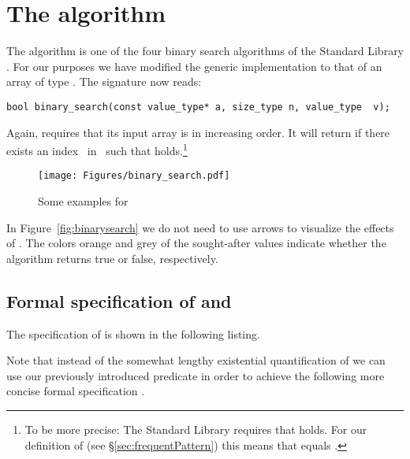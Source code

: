 \section{The \binarysearch algorithm}


The \binarysearch algorithm is one of the four binary search
algorithms of the \cxx Standard Library \cite[\S 28.7.3.4]{cxx-17-draft}.
For our purposes we have modified
the generic implementation
to that of an array of type .
The signature now reads:

\begin{lstlisting}[style = acsl-block]
  bool binary_search(const value_type* a, size_type n, value_type  v);
\end{lstlisting}

Again, \binarysearch requires that its input array is in increasing order.
It will return  if there exists an index~ 
in~ such that  holds.\footnote{%
   To be more precise: The \cxx Standard Library requires that 
    holds.
   For our definition of  (see \S\ref{sec:frequentPattern}) this
   means that  equals .
}

\begin{figure}[hbt]
\centering
\texttt{[image: Figures/binary\_search.pdf]}
\caption{Some examples for \binarysearch}
\end{figure}

\FloatBarrier

In Figure~\ref{fig:binarysearch} we do not need to use arrows to visualize the
effects of \binarysearch.
The colors orange and grey of the sought-after values indicate whether the algorithm
returns true or false, respectively.

\subsection{Formal specification of \binarysearch and \binarysearchii}

The \acsl specification of  is shown in the following listing.



Note that instead of the somewhat lengthy existential quantification
of  we can use our previously introduced predicate
 in order to achieve the following more concise
formal specification .


